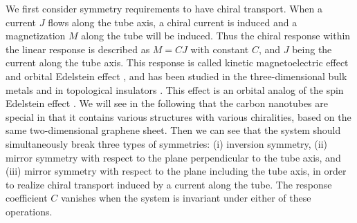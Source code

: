 \documentclass[journal=nalefd,manuscript=article,layout=twocolumn]{achemso}
\begin{document}
% 

We first consider symmetry requirements to have chiral transport. 
When a current $J$ flows along the tube axis, a chiral current is induced and a magnetization $M$ along the tube will be induced. 
Thus the chiral response within the linear response 
is described as $M=CJ$ with constant $C$, and $J$ being the current along the tube axis. 
This response is called kinetic magnetoelectric effect and orbital Edelstein effect
\cite{Shalygin2012, Koretsune2012, Yoda_2015,Yoda_2018, Furukawa2017,zhong, Tsirkin2018, Furukawa2020, Rou2017, Sahin2018, Hara2020}, and 
has been studied in the three-dimensional bulk metals \cite{Yoda_2015,Yoda_2018}and in topological insulators \cite{Osumi_2021}. This effect is an orbital analog of the spin Edelstein 
effect \cite{Edelstein1990, Ivchenko1978, levitov1985nazarov}.
We will see in the following that the carbon nanotubes are special in that it contains various structures with various chiralities, based on the same two-dimensional graphene sheet.
Then we can see that 
the system should simultaneously break three types of symmetries: (i) inversion symmetry, (ii) mirror symmetry with respect to the plane 
perpendicular to the tube axis, and (iii) mirror symmetry with respect to the plane 
including 
the tube axis,  in order to realize chiral transport
induced by a current along the tube. 
The response coefficient $C$ vanishes when the system is invariant under either of these operations. 
\end{document}
